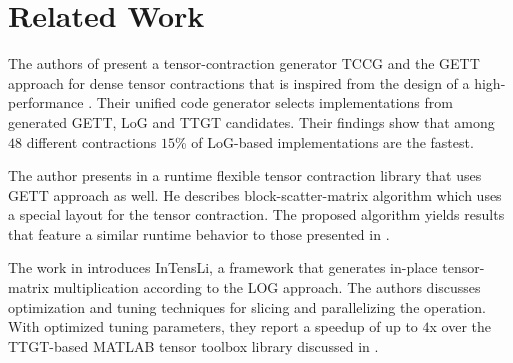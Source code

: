 \section{Related Work}
\label{sec:related}

\begin{comment}
The authors in \cite{dinapoli:2014:towards.efficient.use} discuss the efficient tensor contractions with highly optimized BLAS. 
Based on the LoG approach, they define requirements for the use of \tf{gemm} for class 3 tensor contractions and provide slicing techniques for tensors. %
The slicing recipe for the class 2 categorized tensor contractions contains a short description with a rule of thumb for maximizing performance.
Runtime measurements cover class 3 tensor contractions.
\end{comment}

The authors of \cite{springer:2018:design} present a tensor-contraction generator TCCG and the GETT approach for dense tensor contractions that is inspired from the design of a high-performance .
Their unified code generator selects implementations from generated GETT, LoG and TTGT candidates.
Their findings show that among $48$ different contractions $15$\% of LoG-based implementations are the fastest.

The author presents in \cite{matthews:2018:high} a runtime flexible tensor contraction library that uses GETT approach as well.
He describes block-scatter-matrix algorithm which uses a special layout for the tensor contraction.
The proposed algorithm yields results that feature a similar runtime behavior to those presented in \cite{springer:2018:design}.

The work in \cite{li:2015:input} introduces InTensLi, a framework that generates in-place tensor-matrix multiplication according to the LOG approach. 
The authors discusses optimization and tuning techniques for slicing and parallelizing the operation.
With optimized tuning parameters, they report a speedup of up to $4$x over the TTGT-based MATLAB tensor toolbox library discussed in \cite{bader:2006:algorithm862}.

